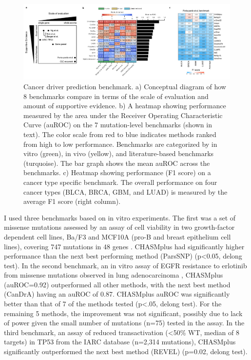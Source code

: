 \begin{figure}
  \centering
  \makeatletter
  \let\@currsize\normalsize
  \includegraphics[width=0.9\linewidth]{figures/chapter6/chasmplus_benchmark.pdf}
  \caption[Cancer driver prediction benchmark.]{Cancer driver prediction benchmark. a) Conceptual diagram of how 8 benchmarks compare in terms of the scale of evaluation and amount of supportive evidence. b) A heatmap showing performance measured by the area under the Receiver Operating Characteristic Curve (auROC) on the 7 mutation-level benchmarks (shown in text). The color scale from red to blue indicates methods ranked from high to low performance.  Benchmarks are categorized by in vitro (green), in vivo (yellow), and literature-based benchmarks (turquoise). The bar graph shows the mean auROC across the benchmarks. c) Heatmap showing performance (F1 score) on a cancer type specific benchmark. The overall performance on four cancer types (BLCA, BRCA, GBM, and LUAD) is measured by the average F1 score (right column).}
  \label{fig:chasmplus_benchmark}
\end{figure}

I used three benchmarks based on in vitro experiments. The first was a set of missense mutations assessed by an assay of cell viability in two growth-factor dependent cell lines, Ba/F3 and MCF10A (pro-B and breast epithelium cell lines), covering 747 mutations in 48 genes \cite{RN187}. CHASMplus had significantly higher performance than the next best performing method (ParsSNP) (p<0.05, delong test). In the second benchmark, an in vitro assay of EGFR resistance to erlotinib from missense mutations observed in lung adenocarcinoma \cite{RN141}, CHASMplus (auROC=0.92) outperformed all other methods, with the next best method (CanDrA) having an auROC of 0.87.  CHASMplus auROC was significantly better than that of 7 of the methods tested (p<.05, delong test).  For the remaining 5 methods, the improvement was not significant, possibly due to lack of power given the small number of mutations (n=75) tested in the assay.  In the third benchmark, an assay of reduced transactivation (<50\% WT, median of 8 targets) in TP53 from the IARC database (n=2,314 mutations)\cite{RN142}, CHASMplus significantly outperformed the next best method (REVEL) (p=0.02, delong test).

